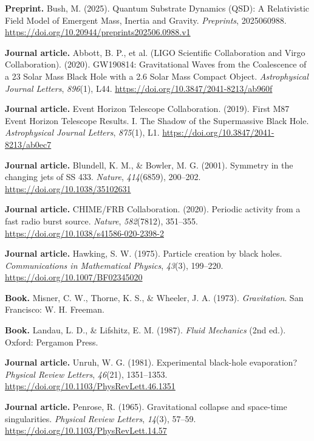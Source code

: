 \documentclass[sn-mathphys]{sn-jnl}
\theoremstyle{thmstyleone}%
\theoremstyle{thmstyletwo}%
\theoremstyle{thmstylethree}%
\begin{document}
\pagebreak
\begin{thebibliography}{99}

\textbf{Preprint.} Bush, M. (2025). Quantum Substrate Dynamics (QSD): A Relativistic Field Model of Emergent Mass, Inertia and Gravity. \textit{Preprints}, 2025060988. \url{https://doi.org/10.20944/preprints202506.0988.v1}

\textbf{Journal article.} Abbott, B. P., et al. (LIGO Scientific Collaboration and Virgo Collaboration). (2020). GW190814: Gravitational Waves from the Coalescence of a 23 Solar Mass Black Hole with a 2.6 Solar Mass Compact Object. \textit{Astrophysical Journal Letters}, \textit{896}(1), L44. \url{https://doi.org/10.3847/2041-8213/ab960f}

\textbf{Journal article.} Event Horizon Telescope Collaboration. (2019). First M87 Event Horizon Telescope Results. I. The Shadow of the Supermassive Black Hole. \textit{Astrophysical Journal Letters}, \textit{875}(1), L1. \url{https://doi.org/10.3847/2041-8213/ab0ec7}

\textbf{Journal article.} Blundell, K. M., \& Bowler, M. G. (2001). Symmetry in the changing jets of SS 433. \textit{Nature}, \textit{414}(6859), 200–202. \url{https://doi.org/10.1038/35102631}

\textbf{Journal article.} CHIME/FRB Collaboration. (2020). Periodic activity from a fast radio burst source. \textit{Nature}, \textit{582}(7812), 351–355. \url{https://doi.org/10.1038/s41586-020-2398-2}

\textbf{Journal article.} Hawking, S. W. (1975). Particle creation by black holes. \textit{Communications in Mathematical Physics}, \textit{43}(3), 199–220. \url{https://doi.org/10.1007/BF02345020}

\textbf{Book.} Misner, C. W., Thorne, K. S., \& Wheeler, J. A. (1973). \textit{Gravitation}. San Francisco: W. H. Freeman.

\textbf{Book.} Landau, L. D., \& Lifshitz, E. M. (1987). \textit{Fluid Mechanics} (2nd ed.). Oxford: Pergamon Press.

\textbf{Journal article.} Unruh, W. G. (1981). Experimental black-hole evaporation? \textit{Physical Review Letters}, \textit{46}(21), 1351–1353. \url{https://doi.org/10.1103/PhysRevLett.46.1351}

\textbf{Journal article.} Penrose, R. (1965). Gravitational collapse and space-time singularities. \textit{Physical Review Letters}, \textit{14}(3), 57–59. \url{https://doi.org/10.1103/PhysRevLett.14.57}

\end{thebibliography}
\end{document}
